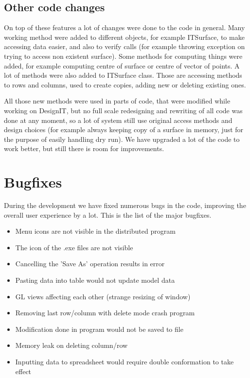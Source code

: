 \documentclass[a4paper, 11pt, article]{report}
\begin{document}
\subsection{Other code changes}

On top of these features a lot of changes were done to the code in general. Many working method were added to different objects, for example ITSurface, to make accessing data easier, and also to verify calls (for example throwing exception on trying to access non existent surface). Some methods for computing things were added, for example computing centre of surface or centre of vector of points. A lot of methods were also added to ITSurface class. Those are accessing methods to rows and columns, used to create copies, adding new or deleting existing ones. 

All those new methods were used in parts of code, that were modified while working on DesignIT, but no full scale redesigning and rewriting of all code was done at any moment, so a lot of system still use original access methods and design choices (for example always keeping copy of a surface in memory, just for the purpose of easily handling dry run). We have upgraded a lot of the code to work better, but still there is room for improvements.

\section{Bugfixes}

During the development we have fixed numerous bugs in the code, improving the overall user experience by a lot. This is the list of the major bugfixes.

\begin{itemize}
\item Menu icons are not visible in the distributed program
\item The icon of the .exe files are not visible
\item Cancelling the 'Save As' operation results in error
\item Pasting data into table would not update model data
\item GL views affecting each other (strange resizing of window)
\item Removing last row/column with delete mode crash program
\item Modification done in program would not be saved to file
\item Memory leak on deleting column/row
\item Inputting data to spreadsheet would require double conformation to take effect
\end{itemize}
\end{document}
